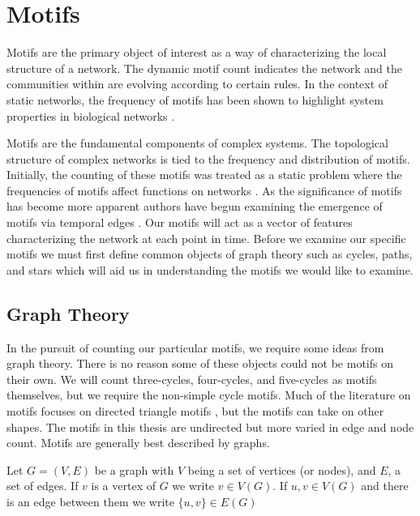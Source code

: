 \chapter{Motifs}
\label{section:Motifs}

Motifs are the primary object of interest as a way of characterizing the local structure of a
network. The dynamic motif count indicates the network and the communities within are evolving according to certain rules.
In the context of static networks, the frequency of motifs 
has been shown to highlight system properties in biological networks \cite{biomotif} \cite{bioAlbert}.

Motifs are the fundamental components of complex systems.
The topological structure of complex networks
is tied to the frequency and distribution of motifs. Initially, the counting of 
these motifs was treated as a static problem where the frequencies of motifs affect functions on networks \cite{motifdiscovery}.
As the significance of motifs has become more apparent authors have begun examining the emergence of motifs 
via temporal edges \cite{temporalmotifs}. Our motifs will
act as a vector of features characterizing the network at each point in time. Before we
examine our specific motifs we must first define common objects of graph theory such as cycles, paths, and stars
which will aid us in understanding the motifs we would like to examine.

\section{Graph Theory}

In the pursuit of counting our particular motifs, we require some
ideas from graph theory. There is no reason some of these objects could not be 
motifs on their own. We will count three-cycles, four-cycles, and five-cycles
as motifs themselves, but we require the non-simple cycle motifs.
Much of the literature on motifs focuses on directed triangle motifs \cite{temporalmotifs} \cite{Milo824} \cite{Interactome}, but 
 the motifs can take on other shapes. The motifs in this thesis are undirected but more varied in edge and node count.
Motifs are generally best described by graphs. 

\begin{dfn}
    Let $G = (V,E)$ be a graph with $V$ being a set of vertices (or nodes), 
and $E$, a set of edges. If $v$ is a vertex of $G$ we write $v \in V(G)$. 
If $u,v \in V(G)$ and there is an edge between them we 
write $\{u,v\} \in E(G)$
\end{dfn}

